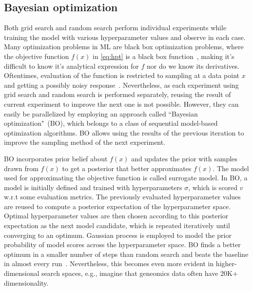 \subsection{Bayesian optimization} 
Both grid search and random search perform individual experiments while training the model with various hyperparameter values and observe in each case. Many optimization problems in ML are black box optimization problems, where the objective function $f(x)$ in \cref{eq:hpt} is a black box function~\cite{BO}, making it's difficult to know it's analytical expression for $f$ nor do we know its derivatives. Oftentimes, evaluation of the function is restricted to sampling at a data point $x$ and getting a possibly noisy response~\cite{BO}.
Nevertheless, as each experiment using grid search and random search is performed separately, reusing the result of current experiment to improve the next one is not possible. However, they can easily be parallelized by employing an approach called ``Bayesian optimization"~(BO), which belongs to a class of sequential model-based optimization algorithms. BO allows using the results of the previous iteration to improve the sampling method of the next experiment.

\hspace*{3.5mm} BO incorporates prior belief about $f(x)$ and updates the prior with samples drawn from $f(x)$ to get a posterior that better approximates $f(x)$. The model used for approximating the objective function is called surrogate model. In BO, a model is initially defined and trained with hyperparameters $\sigma$, which is scored $v$ w.r.t some evaluation metrics. The previously evaluated hyperparameter values are reused to compute a posterior expectation of the hyperparameter space. Optimal hyperparameter values are then chosen according to this posterior expectation as the next model candidate, which is repeated iteratively until converging to an optimum. Gaussian process is employed to model the prior probability of model scores across the hyperparameter space. 
BO finds a better optimum in a smaller number of steps than random search and beats the baseline in almost every run~\cite{BO}. Nevertheless, this becomes even more evident in higher-dimensional search spaces, e.g., imagine that geneomics data often have 20K+ dimensionality. 

